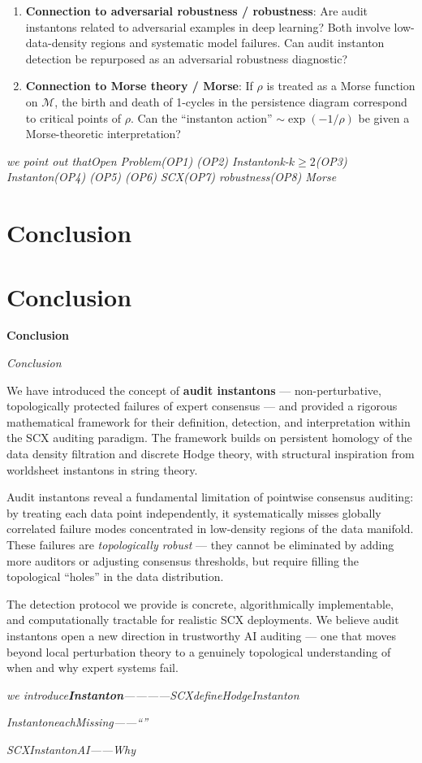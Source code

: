 \documentclass[11pt,a4paper]{article}
\theoremstyle{plain}
\theoremstyle{definition}
\newenvironment{bilingual}[2]{%
  \medskip\noindent\textbf{#1}\par\noindent\textit{#2}\par\smallskip
}{}
\newcommand{\cM}{\mathcal{M}}
\begin{document}
\begin{enumerate}[label=\textbf{OP\arabic*}]
  \item \textbf{Connection to adversarial robustness / robustness}: 
        Are audit instantons related to adversarial examples in deep 
        learning? Both involve low-data-density regions and systematic 
        model failures. Can audit instanton detection be repurposed as 
        an adversarial robustness diagnostic?
  
  \item \textbf{Connection to Morse theory / Morse}: 
        If $\rho$ is treated as a Morse function on $\cM$, the birth and 
        death of 1-cycles in the persistence diagram correspond to 
        critical points of $\rho$. Can the ``instanton action'' 
        $\sim \exp(-1/\rho)$ be given a Morse-theoretic interpretation?
\end{enumerate}

\bigskip
\noindent
\textit{we point out thatOpen Problem(OP1) (OP2) Instantonk-$k \ge 2$(OP3) Instanton(OP4) (OP5) (OP6) SCX(OP7) robustness(OP8) Morse}

\section{Conclusion}
\section*{Conclusion}

\begin{bilingual}{Conclusion}{Conclusion}
We have introduced the concept of \textbf{audit instantons} — non-perturbative, 
topologically protected failures of expert consensus — and provided a 
rigorous mathematical framework for their definition, detection, and 
interpretation within the SCX auditing paradigm. The framework builds on 
persistent homology of the data density filtration and discrete Hodge 
theory, with structural inspiration from worldsheet instantons in string 
theory.

Audit instantons reveal a fundamental limitation of pointwise consensus 
auditing: by treating each data point independently, it systematically 
misses globally correlated failure modes concentrated in low-density 
regions of the data manifold. These failures are \emph{topologically 
robust} — they cannot be eliminated by adding more auditors or adjusting 
consensus thresholds, but require filling the topological ``holes'' in 
the data distribution.

The detection protocol we provide is concrete, algorithmically 
implementable, and computationally tractable for realistic SCX 
deployments. We believe audit instantons open a new direction in 
trustworthy AI auditing — one that moves beyond local perturbation 
theory to a genuinely topological understanding of when and why expert 
systems fail.

\bigskip
\noindent
\textit{we introduce\textbf{Instanton}————SCXdefineHodgeInstanton}

\textit{InstantoneachMissing\textbf{}——``''}

\textit{SCXInstantonAI——Why}
\end{bilingual}
\end{document}
